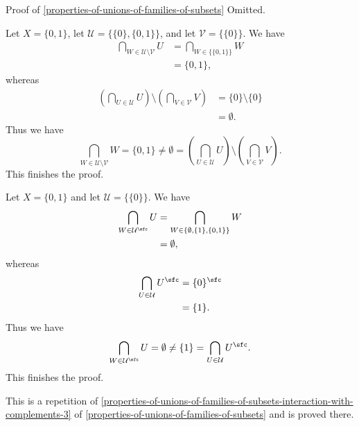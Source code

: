 \begin{Proof}{Proof of \cref{properties-of-unions-of-families-of-subsets}}
    Omitted.

    Let $X=\{0,1\}$, let $\mathcal{U}=\{\{0\},\{0,1\}\}$, and let $\mathcal{V}=\{\{0\}\}$. We have
    \begin{align*}
        \bigcap_{W\in\mathcal{U}\setminus\mathcal{V}}U &= \bigcap_{W\in\{\{0,1\}\}}W\\
                                                       &= \{0,1\},
    \end{align*}
    whereas
    \begin{align*}
        \left(\bigcap_{U\in\mathcal{U}}U\right)\setminus\left(\bigcap_{V\in\mathcal{V}}V\right) &= \{0\}\setminus\{0\}\\
                                                                                                &= \emptyset.
    \end{align*}
    Thus we have
    \[
        \bigcap_{W\in\mathcal{U}\setminus\mathcal{V}}W%
        =%
        \{0,1\}%
        \neq%
        \emptyset%
        =%
        \left(\bigcap_{U\in\mathcal{U}}U\right)\setminus\left(\bigcap_{V\in\mathcal{V}}V\right).%
    \]%
    This finishes the proof.

    Let $X=\{0,1\}$ and let $\mathcal{U}=\{\{0\}\}$. We have
    \begin{align*}
        \bigcap_{W\in\mathcal{U}^{\sfc}}U &= \bigcap_{W\in\{\emptyset,\{1\},\{0,1\}\}}W\\
                                          &= \emptyset,
    \end{align*}
    whereas
    \begin{align*}
        \bigcap_{U\in\mathcal{U}}U^{\sfc} &= \{0\}^{\sfc}\\
                                          &= \{1\}.
    \end{align*}
    Thus we have
    \[
        \bigcap_{W\in\mathcal{U}^{\sfc}}U%
        =%
        \emptyset%
        \neq%
        \{1\}%
        =%
        \bigcap_{U\in\mathcal{U}}U^{\sfc}.%
    \]%
    This finishes the proof.

    This is a repetition of \cref{properties-of-unions-of-families-of-subsets-interaction-with-complements-3} of \cref{properties-of-unions-of-families-of-subsets} and is proved there.


\end{Proof}
